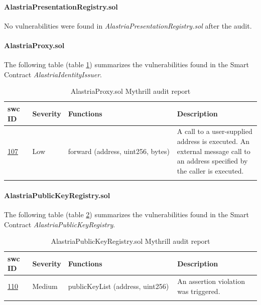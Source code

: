 \documentclass[a4paper, 12pt]{article} %
\begin{document}
            \paragraph{AlastriaPresentationRegistry.sol}
                No vulnerabilities were found in \textit{AlastriaPresentationRegistry.sol} after the audit.
                
            \paragraph{AlastriaProxy.sol}
                The following table (table \ref{tab:AlastriaProxy}) summarizes the vulnerabilities found in the Smart Contract \textit{AlastriaIdentityIssuer}.\newline
                \begin{longtable}{||p{0.1\linewidth} | p{0.11\linewidth} | p{0.45\linewidth} | p{0.35\linewidth}||}
                    \hline
                    \textbf{\acrshort{swc} ID} & \textbf{Severity} & \textbf{Functions} & \textbf{Description} \\ [0.5ex] 
                    \hline\hline
                    \href{https://swcregistry.io/docs/SWC-107}{107} & Low & forward (address, uint256, bytes) & A call to a user-supplied address is executed. An external message call to an address specified by the caller is executed.\\ [1ex] 
                    \hline
                    \caption{AlastriaProxy.sol Mythrill audit report}
                    \label{tab:AlastriaProxy}
                \end{longtable}
                
            \paragraph{AlastriaPublicKeyRegistry.sol}
                The following table (table \ref{tab:AlastriaPublicKeyRegistry}) summarizes the vulnerabilities found in the Smart Contract \textit{AlastriaPublicKeyRegistry}.
                \begin{longtable}{||p{0.1\linewidth} | p{0.11\linewidth} | p{0.45\linewidth} | p{0.35\linewidth}||}
                    \hline
                    \textbf{\acrshort{swc} ID} & \textbf{Severity} & \textbf{Functions} & \textbf{Description} \\ [0.5ex] 
                    \hline\hline
                    \href{https://swcregistry.io/docs/SWC-110}{110} & Medium & publicKeyList (address, uint256) & An assertion violation was triggered.\\ [1ex] 
                    \hline
                    \caption{AlastriaPublicKeyRegistry.sol Mythrill audit report}
                    \label{tab:AlastriaPublicKeyRegistry}
                \end{longtable}
        
\end{document}
